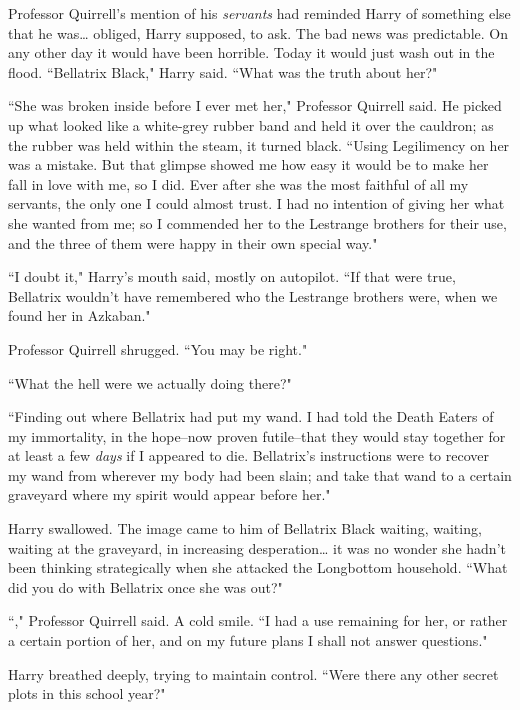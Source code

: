 Professor Quirrell's mention of his \emph{servants} had reminded Harry of something else that he was{\ldots} obliged, Harry supposed, to ask. The bad news was predictable. On any other day it would have been horrible. Today it would just wash out in the flood. ``Bellatrix Black," Harry said. ``What was the truth about her?"

``She was broken inside before I ever met her," Professor Quirrell said. He picked up what looked like a white-grey rubber band and held it over the cauldron; as the rubber was held within the steam, it turned black. ``Using Legilimency on her was a mistake. But that glimpse showed me how easy it would be to make her fall in love with me, so I did. Ever after she was the most faithful of all my servants, the only one I could almost trust. I had no intention of giving her what she wanted from me; so I commended her to the Lestrange brothers for their use, and the three of them were happy in their own special way."

``I doubt it," Harry's mouth said, mostly on autopilot. ``If that were true, Bellatrix wouldn't have remembered who the Lestrange brothers were, when we found her in Azkaban."

Professor Quirrell shrugged. ``You may be right."

``What the hell were we actually doing there?"

``Finding out where Bellatrix had put my wand. I had told the Death Eaters of my immortality, in the hope\---now proven futile\---that they would stay together for at least a few \emph{days} if I appeared to die. Bellatrix's instructions were to recover my wand from wherever my body had been slain; and take that wand to a certain graveyard where my spirit would appear before her."

Harry swallowed. The image came to him of Bellatrix Black waiting, waiting, waiting at the graveyard, in increasing desperation{\ldots} it was no wonder she hadn't been thinking strategically when she attacked the Longbottom household. ``What did you do with Bellatrix once she was out?"

``," Professor Quirrell said. A cold smile. ``I had a use remaining for her, or rather a certain portion of her, and on my future plans I shall not answer questions."

Harry breathed deeply, trying to maintain control. ``Were there any other secret plots in this school year?"

